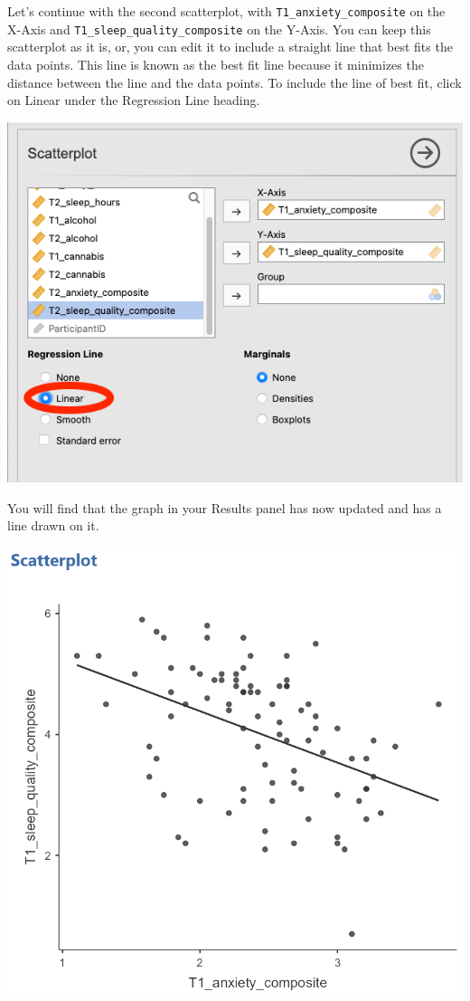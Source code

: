\documentclass[
]{book}
\begin{document}
Let's continue with the second scatterplot, with \texttt{T1\_anxiety\_composite} on the X-Axis and \texttt{T1\_sleep\_quality\_composite} on the Y-Axis. You can keep this scatterplot as it is, or, you can edit it to include a straight line that best fits the data points. This line is known as the best fit line because it minimizes the distance between the line and the data points. To include the line of best fit, click on {Linear} under the Regression Line heading.

\includegraphics{img/linear.png}

You will find that the graph in your Results panel has now updated and has a line drawn on it.

\includegraphics{img/Scatterplot_AnxandSQ_WithLine.png}
\end{document}
